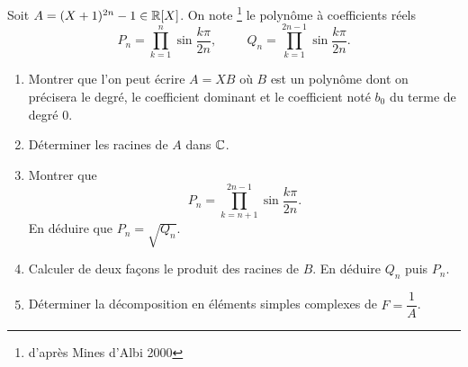 Soit $A=(X+1)^{2n}-1 \in \mathbb{R}[X]$. On note \footnote{d'après Mines d'Albi 2000} le polynôme à coefficients réels 
\[
 P_{n}=\prod_{k=1}^{n}\sin \frac{k \pi}{2n}, \hspace{1cm} Q_{n}=\prod_{k=1}^{2n-1}\sin \frac{k \pi}{2n}.
\]
\begin{enumerate}
\item Montrer que l'on peut écrire $A=XB$ où $B$ est un polynôme dont on précisera le degré, le coefficient dominant et le coefficient noté $b_{0}$ du terme de degré 0.
\item Déterminer les racines de $A$ dans $\mathbb{C}$.
\item Montrer que
\[
P_{n}=\prod_{k=n+1}^{2n-1}\sin \frac{k \pi}{2n}.
\]
En déduire que $P_{n}=\sqrt{Q_{n}}$.
\item Calculer de deux façons le produit des racines de $B$. En déduire $Q_{n}$ puis $P_{n}$.
\item Déterminer la décomposition en éléments simples complexes de $F=\dfrac{1}{A}$.
\end{enumerate}

